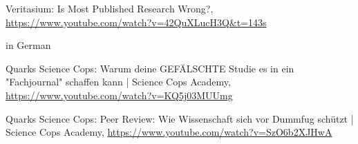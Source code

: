 Veritasium: Is Most Published Research Wrong?, 
\url{https://www.youtube.com/watch?v=42QuXLucH3Q&t=143s}


in German

Quarks Science Cops: Warum deine GEFÄLSCHTE Studie es in ein "Fachjournal" schaffen kann | Science Cops Academy,
\url{https://www.youtube.com/watch?v=KQ5j03MUUmg}

Quarks Science Cops: Peer Review: Wie Wissenschaft sich vor Dummfug schützt | Science Cops Academy, \url{https://www.youtube.com/watch?v=SzO6b2XJHwA}

